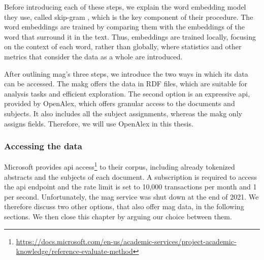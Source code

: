 Before introducing each of these steps, we explain the word embedding model they use, called skip-gram \cite{mikolov2013distributed}, which is the key component of their procedure. The word embeddings are trained by comparing them with the embeddings of the word that surround it in the text. Thus, embeddings are trained locally, focusing on the context of each word, rather than globally, where statistics and other metrics that consider the data as a whole are introduced.

After outlining \acrshort{mag}'s three steps, we introduce the two ways in which its data can be accessed. The \acrfull{makg} \cite{faerber2019microsoft} offers the data in RDF files, which are suitable for analysis tasks and efficient exploration. The second option is an expressive \acrshort{api}, provided by OpenAlex, which offers granular access to the documents and subjects. It also includes all the subject assignments, whereas the \acrshort{makg} only assigns fields. Therefore, we will use OpenAlex in this thesis.







\subsubsection{Accessing the data} \label{mag_access_data}

Microsoft provides \acrshort{api} access\footnote{\url{https://docs.microsoft.com/en-us/academic-services/project-academic-knowledge/reference-evaluate-method}} to their corpus, including already tokenized abstracts and the subjects of each document. A subscription is required to access the \acrshort{api} endpoint and the rate limit is set to 10,000 transactions per month and 1 per second. Unfortunately, the \acrshort{mag} service was shut down at the end of 2021. We therefore discuss two other options, that also offer \acrshort{mag} data, in the following sections. We then close this chapter by arguing our choice between them.





